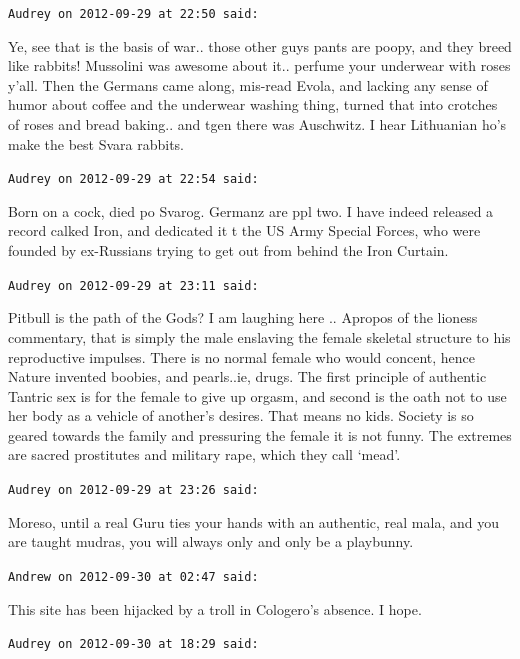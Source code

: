 \begin{footnotesize}\begin{sffamily}



\texttt{Audrey on 2012-09-29 at 22:50 said: }

Ye, see that is the basis of war.. those other guys pants are poopy, and they breed like rabbits! Mussolini was awesome about it.. perfume your underwear with roses y'all. Then the Germans came along, mis-read Evola, and lacking any sense of humor about coffee and the underwear washing thing, turned that into crotches of roses and bread baking.. and tgen there was Auschwitz. I hear Lithuanian ho's make the best Svara rabbits.


\hfill

\texttt{Audrey on 2012-09-29 at 22:54 said: }

Born on a cock, died po Svarog. Germanz are ppl two. I have indeed released a record calked Iron, and dedicated it t the US Army Special Forces, who were founded by ex-Russians trying to get out from behind the Iron Curtain.


\hfill

\texttt{Audrey on 2012-09-29 at 23:11 said: }

Pitbull is the path of the Gods? I am laughing here .. Apropos of the lioness commentary, that is simply the male enslaving the female skeletal structure to his reproductive impulses. There is no normal female who would concent, hence Nature invented boobies, and pearls..ie, drugs. The first principle of authentic Tantric sex is for the female to give up orgasm, and second is the oath not to use her body as a vehicle of another's desires. That means no kids. Society is so geared towards the family and pressuring the female it is not funny. The extremes are sacred prostitutes and military rape, which they call `mead'.


\hfill

\texttt{Audrey on 2012-09-29 at 23:26 said: }

Moreso, until a real Guru ties your hands with an authentic, real mala, and you are taught mudras, you will always only and only be a playbunny.


\hfill

\texttt{Andrew on 2012-09-30 at 02:47 said: }

This site has been hijacked by a troll in Cologero's absence. I hope.


\hfill

\texttt{Audrey on 2012-09-30 at 18:29 said: }


\end{sffamily}
\end{footnotesize}
